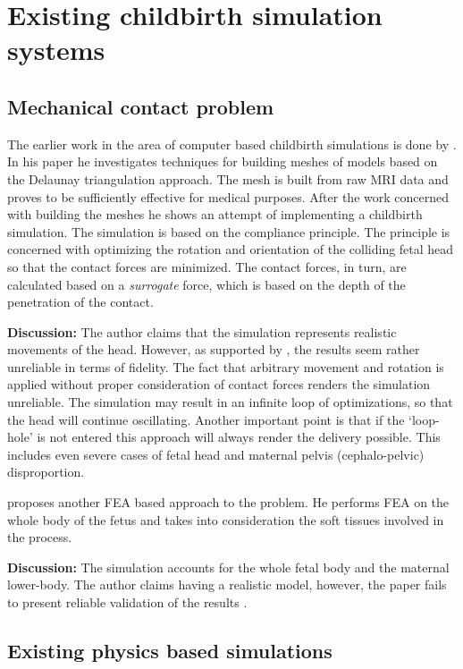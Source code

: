 \section{Existing childbirth simulation systems}\label{lit-existing}

\subsection{Mechanical contact problem}
The earlier work in the area of computer based childbirth simulations is done by \textbf{\citet{GEIGER}}. In his paper he investigates techniques for building meshes of models based on the Delaunay triangulation approach. The mesh is built from raw MRI data and proves to be sufficiently effective for medical purposes. After the work concerned with building the meshes he shows an attempt of implementing a childbirth simulation. The simulation is based on the compliance principle. The principle is concerned with optimizing the rotation and orientation of the colliding fetal head so that the contact forces are minimized. The contact forces, in turn, are calculated based on a \emph{surrogate} force, which is based on the depth of the penetration of the contact.

\textbf{Discussion:} The author claims that the simulation represents realistic movements of the head. However, as supported by \citet{RUDYPHD}, the results seem rather unreliable in terms of fidelity. The fact that arbitrary movement and rotation is applied without proper consideration of contact forces renders the simulation unreliable. The simulation may result in an infinite loop of optimizations, so that the head will continue oscillating. Another important point is that if the `loop-hole' is not entered this approach will always render the delivery possible. This includes even severe cases of fetal head and maternal pelvis (cephalo-pelvic) disproportion.

\textbf{\citet{Wischnik}} proposes another FEA based approach to the problem. He performs FEA on the whole body of the fetus and takes into consideration the soft tissues involved in the process.

\textbf{Discussion:} The simulation accounts for the whole fetal body and the maternal lower-body. The author claims having a realistic model, however, the paper fails to present reliable validation of the results \citep{RUDYPHD}.

\subsection{Existing physics based simulations}

